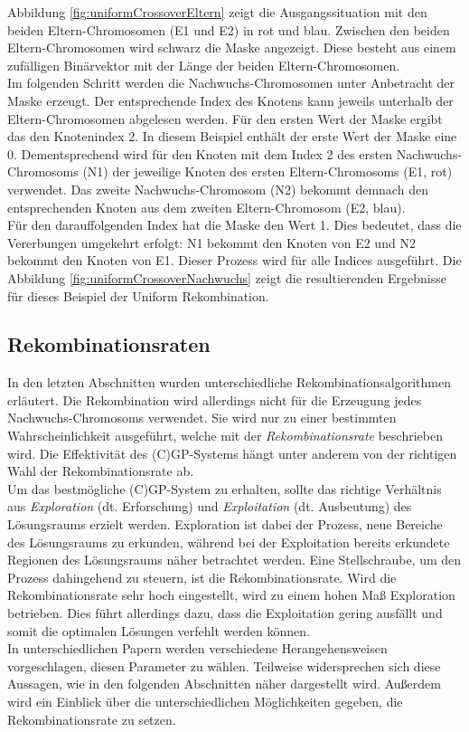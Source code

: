 Abbildung \ref{fig:uniformCrossoverEltern} zeigt die Ausgangssituation mit den beiden Eltern-Chromosomen (E1 und E2) in rot und blau.
Zwischen den beiden Eltern-Chromosomen wird schwarz die Maske angezeigt.
Diese besteht aus einem zufälligen Binärvektor mit der Länge der beiden Eltern-Chromosomen.\\
Im folgenden Schritt werden die Nachwuchs-Chromosomen unter Anbetracht der Maske erzeugt.
Der entsprechende Index des Knotens kann jeweils unterhalb der Eltern-Chro\-mo\-so\-men abgelesen werden.
Für den ersten Wert der Maske ergibt das den Knotenindex 2.
In diesem Beispiel enthält der erste Wert der Maske eine 0.
Dementsprechend wird für den Knoten mit dem Index 2 des ersten Nachwuchs-Chromosoms (N1) der jeweilige Knoten des ersten Eltern-Chromosoms (E1, rot) verwendet.
Das zweite Nachwuchs-Chromosom (N2) bekommt demnach den entsprechenden Knoten aus dem zweiten Eltern-Chromosom (E2, blau).\\
Für den darauffolgenden Index hat die Maske den Wert 1.
Dies bedeutet, dass die Vererbungen umgekehrt erfolgt: N1 bekommt den Knoten von E2 und N2 bekommt den Knoten von E1.
Dieser Prozess wird für alle Indices ausgeführt.
Die Abbildung \ref{fig:uniformCrossoverNachwuchs} zeigt die resultierenden Ergebnisse für dieses Beispiel der Uniform Rekombination.


\subsection{Rekombinationsraten}
\label{subsec:rekombinationsraten}

In den letzten Abschnitten wurden unterschiedliche Rekombinationsalgorithmen erläutert.
Die Rekombination wird allerdings nicht für die Erzeugung jedes Nachwuchs-Chromosoms verwendet.
Sie wird nur zu einer bestimmten Wahrscheinlichkeit ausgeführt, welche mit der \emph{Rekombinationsrate} beschrieben wird.
Die Effektivität des (C)GP-Systems hängt unter anderem von der richtigen Wahl der Rekombinationsrate ab. \cite{hassanat_choosing_2019}\\
Um das bestmögliche (C)GP-System zu erhalten, sollte das richtige Verhältnis aus \emph{Exploration} (dt. Erforschung) und \emph{Exploitation} (dt. Ausbeutung) des Lösungsraums erzielt werden. 
Exploration ist dabei der Prozess, neue Bereiche des Lösungsraums zu erkunden, während bei der Exploitation bereits erkundete Regionen des Lösungsraums näher betrachtet werden.
Eine Stellschraube, um den Prozess dahingehend zu steuern, ist die Rekombinationsrate. \cite{crepinsek_exploration_2013}
Wird die Rekombinationsrate sehr hoch eingestellt, wird zu einem hohen Maß Exploration betrieben. 
Dies führt allerdings dazu, dass die Exploitation gering ausfällt und somit die optimalen Lösungen verfehlt werden können. \cite{pavai_survey_2017}\\
In unterschiedlichen Papern werden verschiedene Herangehensweisen vorgeschlagen, diesen Parameter zu wählen.
Teilweise widersprechen sich diese Aussagen, wie in den folgenden Abschnitten näher dargestellt wird.
Außerdem wird ein Einblick über die unterschiedlichen Möglichkeiten gegeben, die Rekombinationsrate zu setzen.

